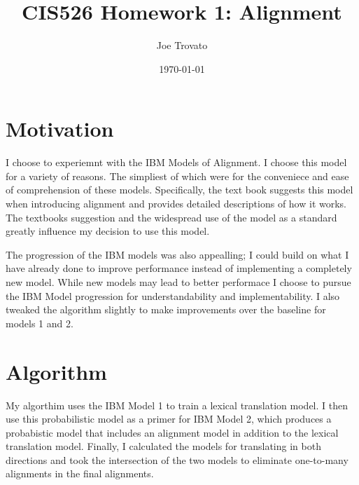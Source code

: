 \documentclass{article}
\begin{document}
\title{CIS526 Homework 1: Alignment}
\author{Joe Trovato}
\date{\today}
\maketitle
\setlength{\parindent}{10ex}

\section{Motivation}
\par
I choose to experiemnt with the IBM Models of Alignment. I choose this model for a variety of reasons. The simpliest of which were for the conveniece and ease of comprehension of these models. Specifically, the text book suggests this model when introducing alignment and provides detailed descriptions of how it works. The textbooks suggestion and the widespread use of the model as a standard greatly influence my decision to use this model. 
\par
The progression of the IBM models was also appealling; I could build on what I have already done to improve performance instead of implementing a completely new model. While new models may lead to better performace I choose to pursue the IBM Model progression for understandability and implementability. I also tweaked the algorithm slightly to make improvements over the baseline for models 1 and 2.


\section{Algorithm}
My algorthim uses the IBM Model 1 to train a lexical translation model. I then use this probabilistic model as a primer for IBM Model 2, which produces a probabistic model that includes an alignment model in addition to the lexical translation model. Finally, I calculated the models for translating in both directions and took the intersection of the two models to eliminate one-to-many alignments in the final alignments.
\end{document}
